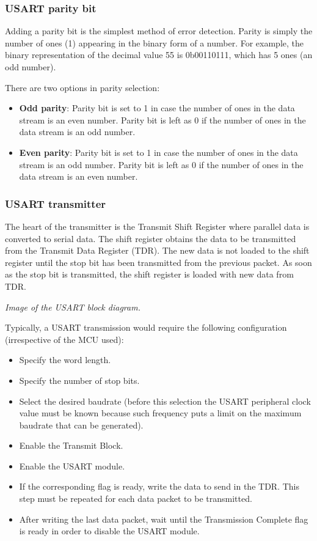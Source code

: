 \documentclass[
a4paper, %
11pt, %
onecolumn, %
openany, %
]{memoir}
\begin{document}
\subsubsection{USART parity bit}
Adding a parity bit is the simplest method of error detection. Parity is simply the number of ones (1) appearing in the binary form of a number. For example, the binary representation of the decimal value 55 is 0b00110111, which has 5 ones (an odd number).

\noindent There are two options in parity selection:

\begin{itemize}
	\item	\textbf{Odd parity}: Parity bit is set to 1 in case the number of ones in the data stream is an even number. Parity bit is left as 0 if the number of ones in the data stream is an odd number.
	\item	\textbf{Even parity}: Parity bit is set to 1 in case the number of ones in the data stream is an odd number. Parity bit is left as 0 if the number of ones in the data stream is an even number.
\end{itemize}

\subsubsection{USART transmitter}
The heart of the transmitter is the Transmit Shift Register where parallel data is converted to serial data. The shift register obtains the data to be transmitted from the Transmit Data Register (TDR). The new data is not loaded to the shift register until the stop bit has been transmitted from the previous packet. As soon as the stop bit is transmitted, the shift register is loaded with new data from TDR.

\begin{center}
\textit{Image of the USART block diagram.}
\end{center}

\noindent Typically, a USART transmission would require the following configuration (irrespective of the MCU used):

\begin{itemize}
	\item	Specify the word length.
	\item	Specify the number of stop bits.
	\item	Select the desired baudrate (before this selection the USART peripheral clock value must be known because such frequency puts a limit on the maximum baudrate that can be generated).
	\item	Enable the Transmit Block.
	\item	Enable the USART module.
	\item	If the corresponding flag is ready, write the data to send in the TDR. This step must be repeated for each data packet to be transmitted.
	\item	After writing the last data packet, wait until the Transmission Complete flag is ready in order to disable the USART module.
\end{itemize}
\end{document}
